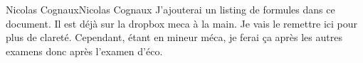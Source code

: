 

{Nicolas Cognaux}{Nicolas Cognaux}
J'ajouterai un listing de formules dans ce document.
Il est déjà sur la dropbox meca à la main.
Je vais le remettre ici pour plus de clareté.
Cependant, étant en mineur méca,
je ferai ça après les autres examens donc après l'examen d'éco.



